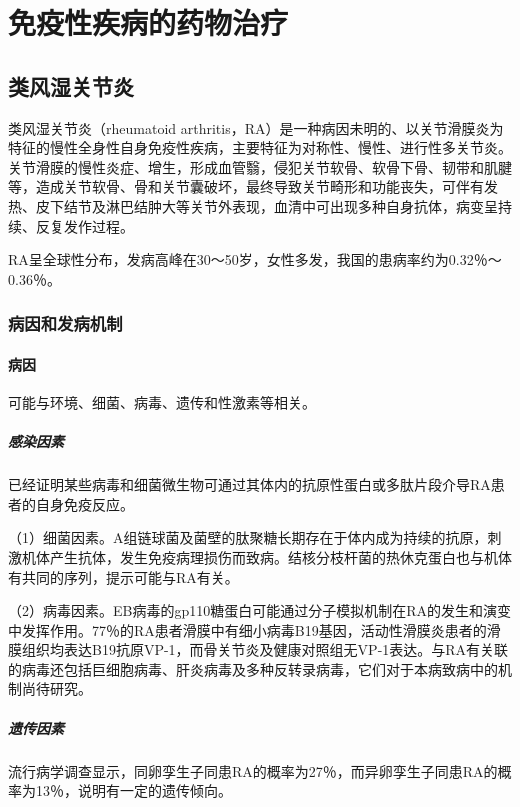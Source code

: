 \chapter{免疫性疾病的药物治疗}

\section{类风湿关节炎}

类风湿关节炎（rheumatoid
arthritis，RA）是一种病因未明的、以关节滑膜炎为特征的慢性全身性自身免疫性疾病，主要特征为对称性、慢性、进行性多关节炎。关节滑膜的慢性炎症、增生，形成血管翳，侵犯关节软骨、软骨下骨、韧带和肌腱等，造成关节软骨、骨和关节囊破坏，最终导致关节畸形和功能丧失，可伴有发热、皮下结节及淋巴结肿大等关节外表现，血清中可出现多种自身抗体，病变呈持续、反复发作过程。

RA呈全球性分布，发病高峰在30～50岁，女性多发，我国的患病率约为0.32％～0.36％。

\subsection{病因和发病机制}

\subsubsection{病因}

可能与环境、细菌、病毒、遗传和性激素等相关。
\paragraph{感染因素}

已经证明某些病毒和细菌微生物可通过其体内的抗原性蛋白或多肽片段介导RA患者的自身免疫反应。

（1）细菌因素。A组链球菌及菌壁的肽聚糖长期存在于体内成为持续的抗原，刺激机体产生抗体，发生免疫病理损伤而致病。结核分枝杆菌的热休克蛋白也与机体有共同的序列，提示可能与RA有关。

（2）病毒因素。EB病毒的gp110糖蛋白可能通过分子模拟机制在RA的发生和演变中发挥作用。77％的RA患者滑膜中有细小病毒B19基因，活动性滑膜炎患者的滑膜组织均表达B19抗原VP-1，而骨关节炎及健康对照组无VP-1表达。与RA有关联的病毒还包括巨细胞病毒、肝炎病毒及多种反转录病毒，它们对于本病致病中的机制尚待研究。
\paragraph{遗传因素}

流行病学调查显示，同卵孪生子同患RA的概率为27％，而异卵孪生子同患RA的概率为13％，说明有一定的遗传倾向。
